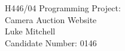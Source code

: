 \documentclass[a4paper, 11pt, twoside]{report}
\begin{document}
\begin{titlepage}
    \thispagestyle{empty}
    \centering
    \vspace*{3cm}
    \Huge{H446/04 Programming Project:} \\ [0.25cm] 
    \Huge{Camera Auction Website} \\
    \vspace{2cm}
    \huge{Luke Mitchell} \\
    \vspace{0.5cm}
    \Large{Candidate Number: 0146}
\end{titlepage}


\tableofcontents



% 
% 
% 
% 
% 
% 
% 


\listoffigures
\newpage
\listoftables
\newpage
\printbibliography[title=Bibliography]
\end{document}
